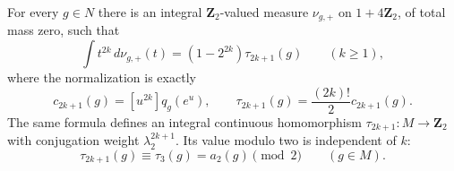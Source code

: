 \begin{lemma}
\label{lem:integral-boundary-measure}
For every $g\in N$ there is an integral $\mathbf Z_2$-valued measure
$\nu_{g,+}$ on $1+4\mathbf Z_2$, of total mass zero, such that
\begin{equation}
 \int t^{2k}\,d\nu_{g,+}(t)
  =(1-2^{2k})\tau_{2k+1}(g)\qquad(k\ge1),
 \label{eq:integral-boundary-moments}
\end{equation}
where the normalization is exactly
\[
 c_{2k+1}(g)=[u^{2k}]q_g(e^u),\qquad
 \tau_{2k+1}(g)=\frac{(2k)!}{2}c_{2k+1}(g).
\]
The same formula defines an integral continuous homomorphism
$\tau_{2k+1}:M\to\mathbf Z_2$ with conjugation weight
$\lambda_2^{2k+1}$. Its value modulo two is independent of $k$:
\[
 \tau_{2k+1}(g)\equiv\tau_3(g)=a_2(g)\pmod2
 \qquad(g\in M).
\]
\end{lemma}
